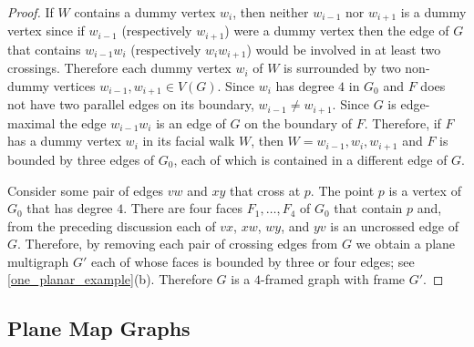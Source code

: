 \documentclass{patmorin}
\theoremstyle{plain}
\theoremstyle{definition}
\newcommand{\note}[2]{\noindent{\color{red}[#1:~#2]}}
\DeclareMathOperator{\dist}{dist}
\renewcommand{\le}{\leqslant}
\begin{document}
\begin{proof}
If $W$ contains a dummy vertex $w_i$, then neither $w_{i-1}$ nor $w_{i+1}$ is a dummy vertex since if $w_{i-1}$ (respectively $w_{i+1}$) were a dummy vertex then the edge of $G$ that contains $w_{i-1}w_i$ (respectively $w_iw_{i+1}$) would be involved in at least two crossings.  Therefore each dummy vertex $w_i$ of $W$ is surrounded by two non-dummy vertices $w_{i-1},w_{i+1}\in V(G)$.  Since $w_i$ has degree $4$ in $G_0$ and $F$ does not have two parallel edges on its boundary, $w_{i-1}\neq w_{i+1}$.  Since $G$ is edge-maximal the edge $w_{i-1}w_i$ is an edge of $G$ on the boundary of $F$.  Therefore, if $F$ has a dummy vertex $w_i$ in its facial walk $W$, then $W=w_{i-1},w_i,w_{i+1}$ and $F$ is bounded by three edges of $G_0$, each of which is contained in a different edge of $G$.


Consider some pair of edges $vw$ and $xy$ that cross at $p$.  The point $p$ is a vertex of $G_0$ that has degree $4$.  There are four faces $F_1,\ldots,F_4$ of $G_0$ that contain $p$ and, from the preceding discussion each of $vx$, $xw$, $wy$, and $yv$ is an uncrossed edge of $G$.  Therefore, by removing each pair of crossing edges from $G$ we obtain a plane multigraph $G'$ each of whose faces is bounded by three or four edges; see \cref{one_planar_example}(b).  Therefore $G$ is a $4$-framed graph with frame $G'$.
\end{proof}

\subsection{Plane Map Graphs}

\end{document}
